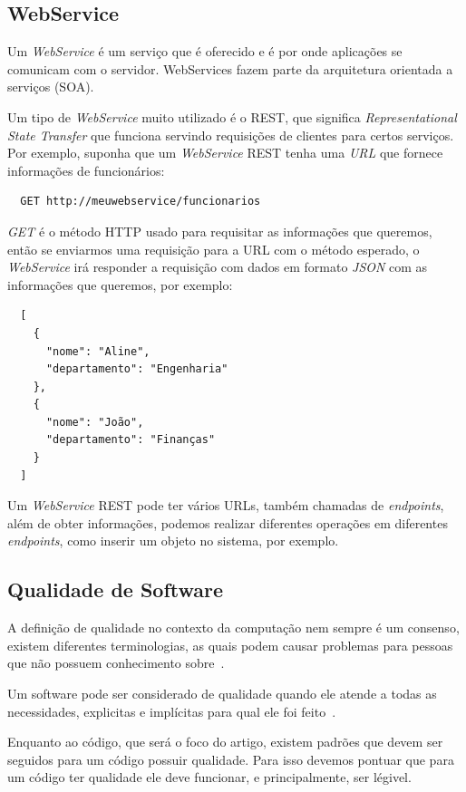 \documentclass[12pt]{article}
\begin{document}
\subsection{WebService}\label{WebService}

Um \textit{WebService} é um serviço que é oferecido e é por onde aplicações se comunicam com o servidor.
WebServices fazem parte da arquitetura orientada a serviços (SOA).

Um tipo de \textit{WebService} muito utilizado é o REST, que significa
\emph{Representational State Transfer} que funciona servindo requisições de clientes
para certos serviços. Por exemplo, suponha que um \textit{WebService} REST tenha uma \textit{URL} que fornece
informações de funcionários:

\begin{verbatim}
  GET http://meuwebservice/funcionarios
\end{verbatim}

\textit{GET} é o método HTTP usado para requisitar as informações que queremos, então se enviarmos uma requisição
para a URL com o método esperado, o \textit{WebService} irá responder a requisição com dados em formato \textit{JSON} com as informações que queremos, por exemplo:

\begin{verbatim}
  [
    {
      "nome": "Aline",
      "departamento": "Engenharia"
    },
    {
      "nome": "João",
      "departamento": "Finanças"
    }
  ]
\end{verbatim}

Um \textit{WebService} REST pode ter vários URLs, também chamadas de \textit{endpoints}, além de obter informações, podemos realizar
diferentes operações em diferentes \textit{endpoints}, como inserir um objeto no sistema, por exemplo.

\subsection{Qualidade de Software}

A definição de qualidade no contexto da computação nem sempre é um consenso,
existem diferentes terminologias, as quais podem causar problemas para pessoas que não
possuem conhecimento sobre~\cite{Duarte03}.

Um software pode ser considerado de qualidade quando ele atende a todas as necessidades, explicitas
e implícitas para qual ele foi feito~\cite{Duarte03}.

Enquanto ao código, que será o foco do artigo, existem padrões que devem ser seguidos para um código
possuir qualidade. Para isso devemos pontuar que para um código ter qualidade ele deve funcionar, e principalmente,
ser légivel.
\end{document}
